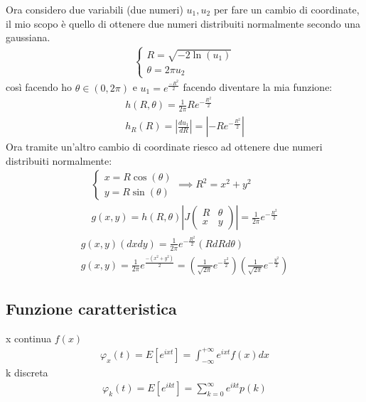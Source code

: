 \documentclass[a4paper, oneside]{article}
\begin{document}
Ora considero due variabili (due numeri) $u_1, u_2$ per fare un cambio di coordinate, il mio scopo è quello di ottenere due numeri distribuiti normalmente secondo una gaussiana.
\begin{gather*}
    \begin{cases}
        R = \sqrt{-2 \ln(u_1)}\\
        \theta = 2 \pi u_2
    \end{cases}
\end{gather*}
così facendo ho $\theta \in (0, 2\pi)$ e $u_1 = e^\frac{-R^2}{2}$ facendo diventare la mia funzione:
\begin{gather*}
    h(R,\theta) = \frac{1}{2\pi} R e^{-\frac{R^2}{2}}\\
    h_R(R) = |\frac{du_1}{dR}| = |-R e^{-\frac{R^2}{2}}|
\end{gather*}
Ora tramite un'altro cambio di coordinate riesco ad ottenere due numeri distribuiti normalmente:
\begin{gather*}
    \begin{cases}
        x = R \cos(\theta)\\
        y = R \sin(\theta)
    \end{cases}
    \implies R^2 = x^2 + y^2\\
    g(x,y) = h(R,\theta) \left| J\begin{pmatrix}
        R & \theta\\
        x & y
    \end{pmatrix} \right| = \frac{1}{2\pi} e^{-\frac{R^2}{2}}
\end{gather*}
\begin{gather*}
    g(x,y) (dx dy) = \frac{1}{2\pi} e ^{-\frac{R^2}{2}} (R dR d\theta)\\
    g(x,y) = \frac{1}{2\pi} e^{\frac{-(x^2+y^2)}{2}} = \left( \frac{1}{\sqrt{2\pi}} e^{-\frac{x^2}{2}} \right) \left( \frac{1}{\sqrt{2\pi}} e^{-\frac{y^2}{2}} \right) 
\end{gather*}

\subsection{Funzione caratteristica}
x continua $f(x)$
\begin{gather*}
    \varphi_x(t) = E[e^{ixt}] = \int_{-\infty}^{+\infty} e^{ixt} f(x) dx
\end{gather*}
k discreta
\begin{gather*}
    \varphi_k(t) = E[e^{ikt}] = \sum_{k=0}^{\infty} e^{ikt} p(k)
\end{gather*}
\end{document}
